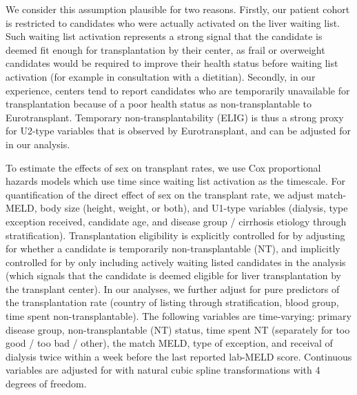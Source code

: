 \documentclass[11pt,twoside,]{book}
\begin{document}
We consider this assumption plausible for two reasons. Firstly, our patient
cohort is restricted to candidates who were actually activated
on the liver waiting list. Such waiting list activation represents a strong signal
that the candidate is deemed fit enough for transplantation by their center,
as frail or overweight candidates would be required to improve their health status
before waiting list activation (for example in consultation with a dietitian).
Secondly, in our experience, centers tend to report candidates who are temporarily
unavailable for transplantation because of a poor health status as non-transplantable
to Eurotransplant. Temporary non-transplantability (ELIG) is thus a strong proxy
for U2-type variables that is observed by Eurotransplant, and can be adjusted
for in our analysis.

\newpage

To estimate the effects of sex on transplant rates, we use Cox proportional
hazards models which use time since waiting list activation as the timescale.
For quantification of the direct effect of sex on the transplant rate, we adjust
match-MELD, body size (height, weight, or both), and U1-type variables
(dialysis, type exception received, candidate age, and disease group / cirrhosis
etiology through stratification). Transplantation eligibility is explicitly controlled for
by adjusting for whether a candidate is temporarily non-transplantable
(NT), and implicitly controlled for by only including actively waiting listed
candidates in the analysis (which signals that the candidate is deemed eligible
for liver transplantation by the transplant center). In our analyses, we further
adjust for pure predictors of the transplantation
rate (country of listing through stratification, blood group, time spent non-transplantable).
The following variables are time-varying: primary disease group,
non-transplantable (NT) status, time spent NT (separately for too good / too bad / other), the match
MELD, type of exception, and receival of dialysis twice within a week before the last
reported lab-MELD score. Continuous variables are adjusted for with natural
cubic spline transformations with 4 degrees of freedom.
\end{document}
